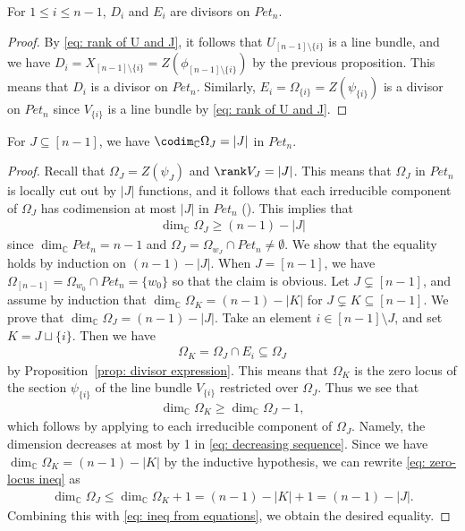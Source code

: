 \begin{coro}\label{cor: cartier}
For $1\le i\le n-1$, $D_i$ and $E_i$ are divisors on $Pet_{n}$.
\end{coro}

\begin{proof}
By \eqref{eq: rank of U and J}, it follows that $U_{[n-1]\setminus\{i\}}$ is a line bundle, and we have $D_i=X_{[n-1]\setminus\{i\}}=Z(\phi_{[n-1]\setminus\{i\}})$ by the previous proposition. This means that $D_i$ is a divisor on $Pet_{n}$. Similarly, $E_i=\Omega_{\{i\}}=Z(\psi_{\{i\}})$ is a divisor on $Pet_{n}$ since $V_{\{i\}}$ is a line bundle by \eqref{eq: rank of U and J}.
\end{proof}

\begin{coro}\label{cor: codim of OmegaJ}
For $J\subseteq[n-1]$, we have $\codim_{{\mathbb C}} \Omega_J=|J|$ in $Pet_{n}$.
\end{coro}

\begin{proof}
Recall that $\Omega_J =Z(\psi_J)$ and $\rank V_{J}=|J|$. This means that $\Omega_J$ in $Pet_{n}$ is locally cut out by $|J|$ functions, and it follows that each irreducible component of $\Omega_J$ has codimension at most $|J|$ in $Pet_{n}$ (\cite[Proposition 14.1]{Fulton}). This implies that
\begin{align}\label{eq: ineq from equations}
\dim_{{\mathbb C}}\Omega_J\ge (n-1)-|J|
\end{align}
since $\dim_{{\mathbb C}}Pet_{n}=n-1$ and $\Omega_J=\Omega_{w_J}\cap Pet_{n}\ne\emptyset$. We show that the equality holds by induction on $(n-1)-|J|$. When $J=[n-1]$, we have $\Omega_{[n-1]}=\Omega_{w_0}\cap Pet_{n}=\{w_0\}$ so that the claim is obvious. Let $J\subsetneq[n-1]$, and assume by induction that $\dim_{{\mathbb C}}\Omega_K= (n-1)-|K|$ for $J\subsetneq K\subseteq[n-1]$. We prove that $\dim_{{\mathbb C}}\Omega_J= (n-1)-|J|$. Take an element $i\in[n-1]\setminus J$, and set $K=J\sqcup\{i\}$. Then we have 
\begin{align}\label{eq: decreasing sequence}
\Omega_{K}=\Omega_J\cap E_i \subseteq \Omega_J
\end{align}
by Proposition~\ref{prop: divisor expression}. This means that $\Omega_{K}$ is the zero locus of the section $\psi_{\{i\}}$ of the line bundle $V_{\{i\}}$ restricted over $\Omega_{J}$. Thus we see that 
\begin{align}\label{eq: zero-locus ineq}
\dim_{{\mathbb C}}\Omega_{K} \ge \dim_{{\mathbb C}} \Omega_{J} -1,
\end{align}
which follows by applying \cite[Proposition 14.1]{Fulton} to each irreducible component of $\Omega_{J}$. Namely, the dimension decreases at most by 1 in \eqref{eq: decreasing sequence}. Since we have $\dim_{{\mathbb C}}\Omega_K= (n-1)-|K|$ by the inductive hypothesis, we can rewrite \eqref{eq: zero-locus ineq} as
\begin{align*}
\dim_{{\mathbb C}}\Omega_{J} \le \dim_{{\mathbb C}}\Omega_K +1 = (n-1) - |K| + 1 = (n-1) - |J|.
\end{align*}
Combining this with \eqref{eq: ineq from equations}, we obtain the desired equality.
\end{proof}

